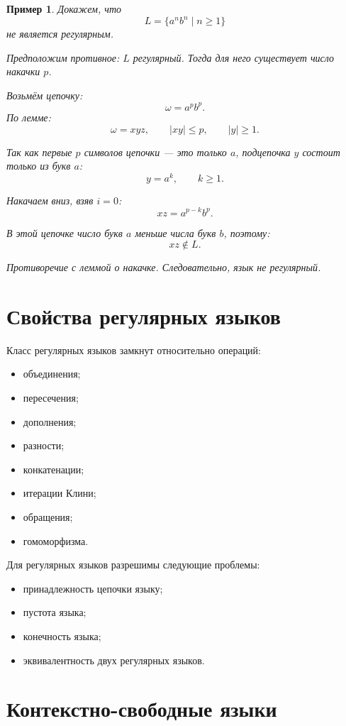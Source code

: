 \documentclass[12pt,a4paper]{article}
\newtheorem{example}{Пример}
\begin{document}
\begin{example}
Докажем, что
\[
L=\{a^n b^n\mid n\ge 1\}
\]
не является регулярным.

Предположим противное: $L$ регулярный. Тогда для него существует число накачки $p$.

Возьмём цепочку:
\[
\omega=a^p b^p.
\]
По лемме:
\[
\omega=xyz,\qquad |xy|\le p,\qquad |y|\ge 1.
\]

Так как первые $p$ символов цепочки --- это только $a$, подцепочка $y$ состоит только из букв $a$:
\[
y=a^k,\qquad k\ge 1.
\]

Накачаем вниз, взяв $i=0$:
\[
xz=a^{p-k}b^p.
\]

В этой цепочке число букв $a$ меньше числа букв $b$, поэтому:
\[
xz\notin L.
\]

Противоречие с леммой о накачке. Следовательно, язык не регулярный.
\end{example}

\section{Свойства регулярных языков}

Класс регулярных языков замкнут относительно операций:
\begin{itemize}
    \item объединения;
    \item пересечения;
    \item дополнения;
    \item разности;
    \item конкатенации;
    \item итерации Клини;
    \item обращения;
    \item гомоморфизма.
\end{itemize}

Для регулярных языков разрешимы следующие проблемы:
\begin{itemize}
    \item принадлежность цепочки языку;
    \item пустота языка;
    \item конечность языка;
    \item эквивалентность двух регулярных языков.
\end{itemize}

\section{Контекстно-свободные языки}
\end{document}
